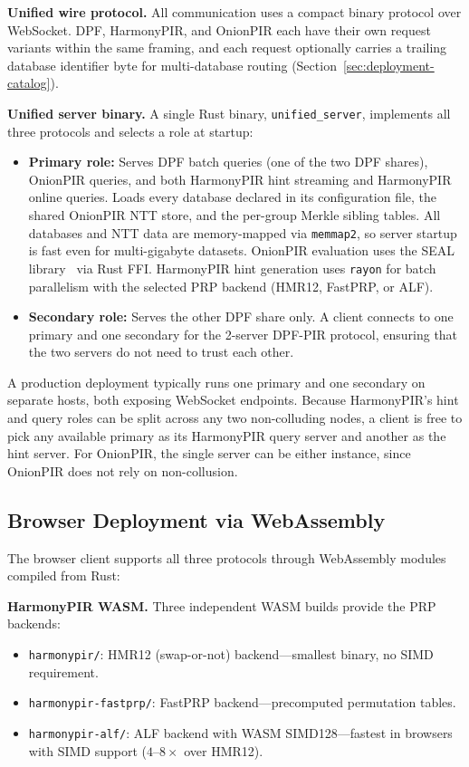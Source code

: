 \textbf{Unified wire protocol.} All communication uses a compact binary protocol over WebSocket. DPF, HarmonyPIR, and OnionPIR each have their own request variants within the same framing, and each request optionally carries a trailing database identifier byte for multi-database routing (Section~\ref{sec:deployment-catalog}).

\textbf{Unified server binary.} A single Rust binary, \texttt{unified\_server}, implements all three protocols and selects a role at startup:
\begin{itemize}[nolistsep,leftmargin=*]
    \item \textbf{Primary role:} Serves DPF batch queries (one of the two DPF shares), OnionPIR queries, and both HarmonyPIR hint streaming and HarmonyPIR online queries. Loads every database declared in its configuration file, the shared OnionPIR NTT store, and the per-group Merkle sibling tables. All databases and NTT data are memory-mapped via \texttt{memmap2}, so server startup is fast even for multi-gigabyte datasets. OnionPIR evaluation uses the SEAL library~\cite{seal} via Rust FFI. HarmonyPIR hint generation uses \texttt{rayon} for batch parallelism with the selected PRP backend (HMR12, FastPRP, or ALF).
    \item \textbf{Secondary role:} Serves the other DPF share only. A client connects to one primary and one secondary for the 2-server DPF-PIR protocol, ensuring that the two servers do not need to trust each other.
\end{itemize}
A production deployment typically runs one primary and one secondary on separate hosts, both exposing WebSocket endpoints. Because HarmonyPIR's hint and query roles can be split across any two non-colluding nodes, a client is free to pick any available primary as its HarmonyPIR query server and another as the hint server. For OnionPIR, the single server can be either instance, since OnionPIR does not rely on non-collusion.

\subsection{Browser Deployment via WebAssembly}

The browser client supports all three protocols through WebAssembly \cite{wasm} modules compiled from Rust:

\textbf{HarmonyPIR WASM.} Three independent WASM builds provide the PRP backends:
\begin{itemize}[nolistsep,leftmargin=*]
    \item \texttt{harmonypir/}: HMR12 (swap-or-not) backend---smallest binary, no SIMD requirement.
    \item \texttt{harmonypir-fastprp/}: FastPRP backend---precomputed permutation tables.
    \item \texttt{harmonypir-alf/}: ALF backend with WASM SIMD128---fastest in browsers with SIMD support ($4$--$8\times$ over HMR12).
\end{itemize}


